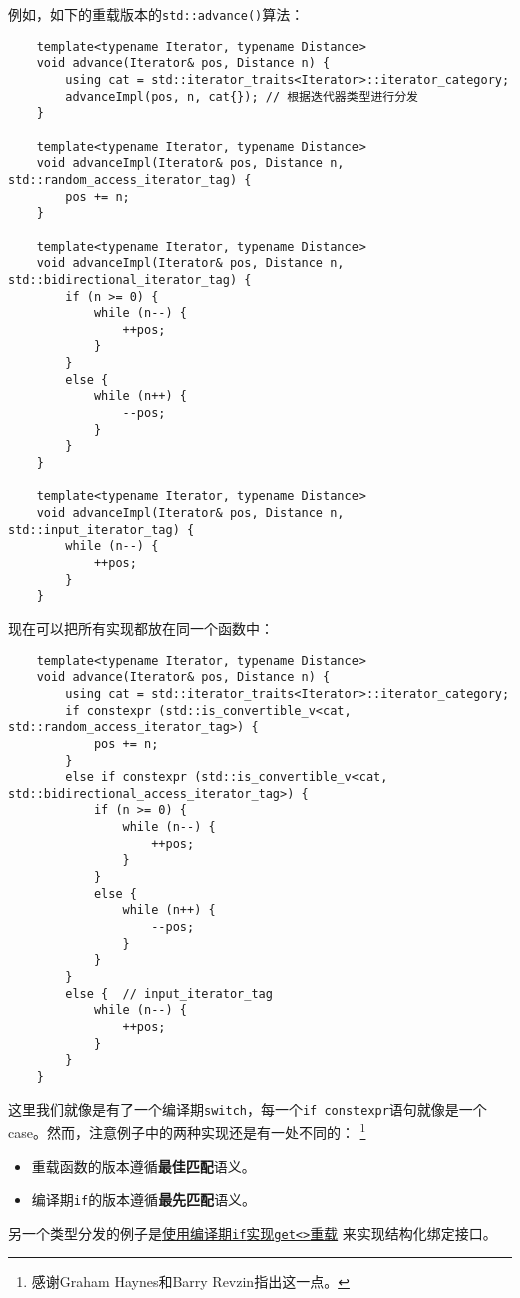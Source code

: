 例如，如下的重载版本的\texttt{std::advance()}算法：
\begin{lstlisting}
    template<typename Iterator, typename Distance>
    void advance(Iterator& pos, Distance n) {
        using cat = std::iterator_traits<Iterator>::iterator_category;
        advanceImpl(pos, n, cat{}); // 根据迭代器类型进行分发
    }

    template<typename Iterator, typename Distance>
    void advanceImpl(Iterator& pos, Distance n, std::random_access_iterator_tag) {
        pos += n;
    }

    template<typename Iterator, typename Distance>
    void advanceImpl(Iterator& pos, Distance n, std::bidirectional_iterator_tag) {
        if (n >= 0) {
            while (n--) {
                ++pos;
            }
        }
        else {
            while (n++) {
                --pos;
            }
        }
    }

    template<typename Iterator, typename Distance>
    void advanceImpl(Iterator& pos, Distance n, std::input_iterator_tag) {
        while (n--) {
            ++pos;
        }
    }
\end{lstlisting}
现在可以把所有实现都放在同一个函数中：
\begin{lstlisting}
    template<typename Iterator, typename Distance>
    void advance(Iterator& pos, Distance n) {
        using cat = std::iterator_traits<Iterator>::iterator_category;
        if constexpr (std::is_convertible_v<cat, std::random_access_iterator_tag>) {
            pos += n;
        }
        else if constexpr (std::is_convertible_v<cat, std::bidirectional_access_iterator_tag>) {
            if (n >= 0) {
                while (n--) {
                    ++pos;
                }
            }
            else {
                while (n++) {
                    --pos;
                }
            }
        }
        else {  // input_iterator_tag
            while (n--) {
                ++pos;
            }
        }
    }
\end{lstlisting}
这里我们就像是有了一个编译期\texttt{switch}，每一个\texttt{if constexpr}语句就像是一个
case。然而，注意例子中的两种实现还是有一处不同的：
\footnote{感谢Graham Haynes和Barry Revzin指出这一点。}
\begin{itemize}
    \item 重载函数的版本遵循\textbf{最佳匹配}语义。
    \item 编译期\texttt{if}的版本遵循\textbf{最先匹配}语义。
\end{itemize}
另一个类型分发的例子是\hyperref[编译期if实现get<>]{使用编译期\texttt{if}实现\texttt{get<>}重载}
来实现结构化绑定接口。

